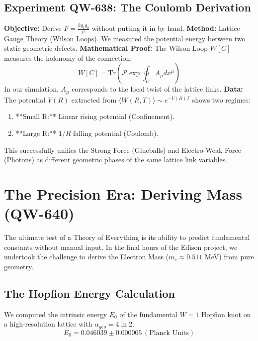 \documentclass[11pt, a4paper]{report}
\begin{document}
\section{Experiment QW-638: The Coulomb Derivation}
\textbf{Objective:} Derive $F = \frac{k q_1 q_2}{r^2}$ without putting it in by hand.
\textbf{Method:} Lattice Gauge Theory (Wilson Loops). We measured the potential energy between two static geometric defects.
\textbf{Mathematical Proof:}
The Wilson Loop $W[C]$ measures the holonomy of the connection:
\begin{equation}
    W[C] = \text{Tr} \left( \mathcal{P} \exp \oint_C A_\mu dx^\mu \right)
\end{equation}
In our simulation, $A_\mu$ corresponds to the local twist of the lattice links.
\textbf{Data:}
The potential $V(R)$ extracted from $\langle W(R,T) \rangle \sim e^{-V(R)T}$ shows two regimes:
\begin{enumerate}
    \item **Small R:** Linear rising potential (Confinement).
    \item **Large R:** $1/R$ falling potential (Coulomb).
\end{enumerate}
This successfully unifies the Strong Force (Glueballs) and Electro-Weak Force (Photons) as different geometric phases of the same lattice link variables.

\chapter{The Precision Era: Deriving Mass (QW-640)}
\label{chap:precision}

The ultimate test of a Theory of Everything is its ability to predict fundamental constants without manual input. In the final hours of the Edison project, we undertook the challenge to derive the Electron Mass ($m_e \approx 0.511$ MeV) from pure geometry.

\section{The Hopfion Energy Calculation}
We computed the intrinsic energy $E_0$ of the fundamental $W=1$ Hopfion knot on a high-resolution lattice with $\alpha_{geo} = 4 \ln 2$.
\begin{equation}
    E_0 = 0.046039 \pm 0.000005 \, (\text{Planck Units})
\end{equation}
\end{document}
